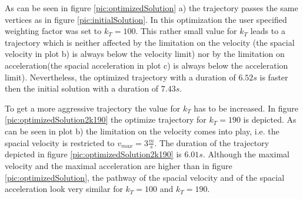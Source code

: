 As can be seen in figure \ref{pic:optimizedSolution} a) the trajectory passes the same vertices as in figure \ref{pic:initialSolution}. 
In this optimization the user specified weighting factor was set to $k_T = 100$. This rather small value for $k_T$ leads to a trajectory which is neither affected by the limitation on the velocity (the spacial velocity in plot b) is always below the velocity limit) nor by the limitation on acceleration(the spacial acceleration in plot c) is always below the acceleration limit). Nevertheless, the optimized trajectory with a duration of $6.52 s$ is faster then the initial solution with a duration of $7.43 s$.\newline

To get a more aggressive trajectory the value for $k_T$ has to be increased. In figure \ref{pic:optimizedSolution2k190} the optimize trajectory for $k_T = 190$ is depicted. As can be seen in plot b) the limitation on the velocity comes into play, i.e. the spacial velocity is restricted to $v_{max} = 3 \frac{m}{s}$. The duration of the trajectory depicted in figure \ref{pic:optimizedSolution2k190} is $6.01s$. Although the maximal velocity and the maximal acceleration are higher than in figure \ref{pic:optimizedSolution}, the pathway of the spacial velocity and of the spacial acceleration look very similar for $k_T = 100$ and $k_T = 190$.

